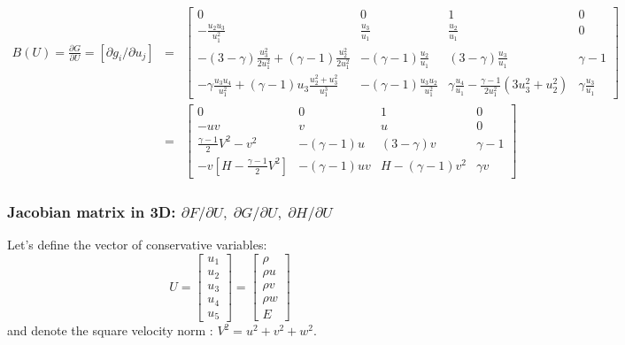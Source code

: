 \documentclass{article}
\begin{document}
\begin{eqnarray}
  B(U) = \frac{\partial G}{\partial U} = \left[ \partial g_i/\partial u_j \right] & = & \left[
    \begin{array}{cccc}
      0 & 0 & 1 & 0\\
      -\frac{u_2 u_3}{u_1^2} & \frac{u_3}{u_1} & \frac{u_2}{u_1} & 0\\
      -(3-\gamma)\frac{u_3^2}{2 u_1^2} + (\gamma-1)\frac{u_2^2}{2 u_1^2} & -(\gamma-1)\frac{u_2}{u_1} & (3-\gamma) \frac{u_3}{u_1} & \gamma-1\\
       -\gamma\frac{u_3 u_4}{u_1^2} + (\gamma-1)u_3 \frac{u_2^2+u_3^2}{u_1^3} & -(\gamma-1)\frac{u_3 u_2}{u_1^2} & \gamma \frac{u_4}{u_1} -\frac{\gamma-1}{2 u_1^2} (3u_3^2+u_2^2) &\gamma \frac{u_3}{u_1}
    \end{array}
  \right]\\
  &=& \left[
    \begin{array}{cccc}
      0 & 0 & 1 & 0\\
      -u v & v & u & 0\\
      \frac{\gamma-1}{2}V^2-v^2 & -(\gamma-1)u  & (3-\gamma) v & \gamma-1\\
      - v [H-\frac{\gamma-1}{2} V^2 ] & -(\gamma-1)uv & H-(\gamma-1)v^2 &\gamma v
    \end{array}
  \right]
\end{eqnarray}

\newpage 
\subsubsection*{Jacobian matrix in 3D: \boldmath $\partial F/\partial U, \; \partial G/\partial U, \; \partial H/\partial U$}

Let's define the vector of conservative variables:
\begin{equation}
  U = \left[
    \begin{array}{c}
      u_1\\
      u_2\\
      u_3\\
      u_4\\
      u_5
    \end{array}
  \right] = \left[
    \begin{array}{c}
      \rho\\
      \rho u\\
      \rho v\\
      \rho w\\
      E
    \end{array}
  \right]
\end{equation}
and denote the square velocity norm : $V^2=u^2+v^2+w^2$.
\end{document}
